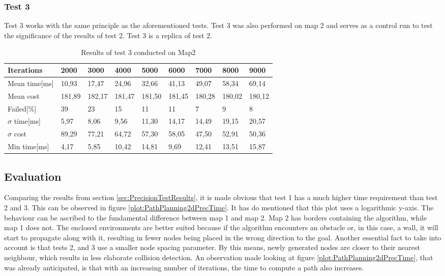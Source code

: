 \subsubsection{Test 3}
\label{sec:test3}
Test 3 works with the same principle as the aforementioned tests. Test 3 was also performed on map 2 and serves as a control run to test the significance of the results of test 2. Test 3 is a replica of test 2.

\begin{table}[!ht]
	\centering
	\renewcommand{\arraystretch}{1.2}
	\begin{tabular}{|l||l|l|l|l|l|l|l|l|}
		\hline
		Iterations & 2000 & 3000 & 4000 & 5000 & 6000 & 7000 & 8000 & 9000 \\ \hline\hline
		Mean time[ms] & 10,93  & 17,47  & 24,96  & 32,66  & 41,13  & 49,07  & 58,34  & 69,14  \\ \hline
		Mean cost & 181,89  & 182,17  & 181,47  & 181,50  & 181,45  & 180,28  & 180,02  & 180,12  \\ \hline
		Failed[\%] & 39  & 23  & 15  & 11  & 11  & 7  & 9  & 8  \\ \hline
		$\sigma$ time[ms] & 5,97  & 8,06  & 9,56  & 11,30  & 14,17  & 14,49  & 19,15  & 20,57  \\ \hline
		$\sigma$ cost & 89,29  & 77,21  & 64,72  & 57,30  & 58,05  & 47,50  & 52,91  & 50,36  \\ \hline
		Min time[ms] & 4,17  & 5,85  & 10,42  & 14,81  & 9,69  & 12,41  & 13,51  & 15,87  \\ \hline
	\end{tabular}
	\label{tab:pp_precision3}
	\caption{Results of test 3 conducted on Map2}
\end{table}

\subsection{Evaluation}
\label{sec:PrecisionTestEval}
Comparing the results from section \ref{sec:PrecisionTestResults}, it is made obvious that test 1 has a much higher time requirement than test 2 and 3. This can be observed in figure \ref{plot:PathPlanning2dPrecTime}. It has do mentioned that this plot uses a logarithmic y-axis. The behaviour can be ascribed to the fundamental difference between map 1 and map 2. Map 2 has borders containing the algorithm, while map 1 does not. The enclosed environments are better suited because if the algorithm encounters an obstacle or, in this case, a wall, it will start to propagate along with it, resulting in fewer nodes being placed in the wrong direction to the goal. 
Another essential fact to take into account is that tests 2, and 3 use a smaller node spacing parameter. By this means, newly generated nodes are closer to their nearest neighbour, which results in less elaborate collision detection. 
An observation made looking at figure \ref{plot:PathPlanning2dPrecTime}, that was already anticipated, is that with an increasing number of iterations, the time to compute a path also increases. 

